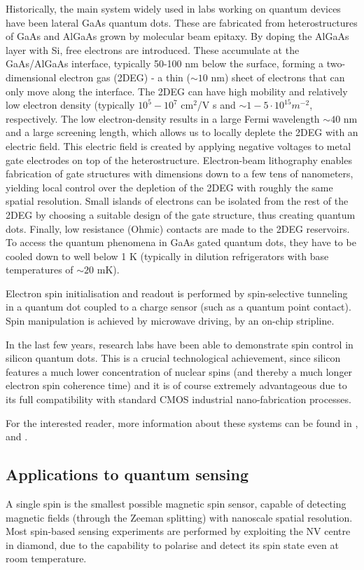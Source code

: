 \documentclass[a4paper,11pt]{article}
\begin{document}
Historically, the main system widely used in labs working on quantum devices have been lateral GaAs quantum dots. These are fabricated from heterostructures of GaAs and AlGaAs grown by molecular beam epitaxy. By doping the AlGaAs layer with Si, free electrons are introduced. These accumulate at the GaAs/AlGaAs interface, typically 50-100 nm below the surface, forming a two-dimensional electron gas (2DEG) - a thin ($\sim 10$ nm) sheet of electrons that can only move along the interface. The 2DEG can have high mobility and relatively low electron density (typically $10^5 - 10^7$ cm$^2$/V s and $\sim 1-5 \cdot 10^15 m^{-2}$, respectively. The low electron-density results in a large Fermi wavelength $\sim 40$ nm and a large screening length, which allows us to locally deplete the 2DEG with an electric field. This electric field is created by applying negative voltages to metal gate electrodes on top of the heterostructure.
Electron-beam lithography enables fabrication of gate structures with dimensions down to a few tens of nanometers, yielding local control over the depletion of the 2DEG with roughly the same spatial resolution. Small islands of electrons can be isolated from the rest of the 2DEG by choosing a suitable design of the gate structure, thus creating quantum dots. Finally, low resistance (Ohmic) contacts are made to the 2DEG reservoirs. To access the quantum phenomena in GaAs gated quantum dots, they have to be cooled down to well below 1 K (typically in dilution refrigerators with base temperatures of $\sim 20$ mK).

Electron spin initialisation and readout is performed by spin-selective tunneling in a quantum dot coupled to a charge sensor (such as a quantum point contact). Spin manipulation is achieved by microwave driving, by an on-chip stripline.

In the last few years, research labs have been able to demonstrate spin control in silicon quantum dots. This is a crucial technological achievement, since silicon features a much lower concentration of nuclear spins (and thereby a much longer electron spin coherence time) and it is of course extremely advantageous due to its full compatibility with standard CMOS industrial nano-fabrication processes.

For the interested reader, more information about these systems can be found in \cite{hanson_spins_2007}, \cite{morton_embracing_2011} and \cite{zwanenburg_silicon_2013}.


\subsection {Applications to quantum sensing}
A single spin is the smallest possible magnetic spin sensor, capable of detecting magnetic fields (through the Zeeman splitting) with nanoscale spatial resolution. Most spin-based sensing experiments are performed by exploiting the NV centre in diamond, due to the capability to polarise and detect its spin state even at room temperature.
\end{document}
